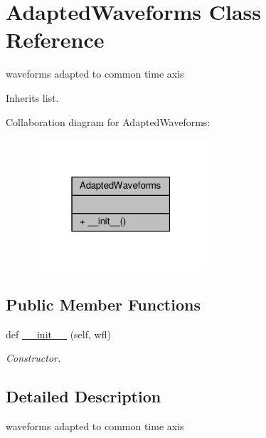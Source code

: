 \hypertarget{classSignalIntegrity_1_1TimeDomain_1_1Waveform_1_1AdaptedWaveforms_1_1AdaptedWaveforms}{}\section{Adapted\+Waveforms Class Reference}
\label{classSignalIntegrity_1_1TimeDomain_1_1Waveform_1_1AdaptedWaveforms_1_1AdaptedWaveforms}


waveforms adapted to common time axis  




Inherits list.



Collaboration diagram for Adapted\+Waveforms\+:
\nopagebreak
\begin{figure}[H]
\begin{center}
\leavevmode
\includegraphics[width=183pt]{classSignalIntegrity_1_1TimeDomain_1_1Waveform_1_1AdaptedWaveforms_1_1AdaptedWaveforms__coll__graph}
\end{center}
\end{figure}
\subsection*{Public Member Functions}
\begin{DoxyCompactItemize}
\item 
def \hyperlink{classSignalIntegrity_1_1TimeDomain_1_1Waveform_1_1AdaptedWaveforms_1_1AdaptedWaveforms_a15e87afe4d8ac1102a3665f80cb0611a}{\+\_\+\+\_\+init\+\_\+\+\_\+} (self, wfl)
\begin{DoxyCompactList}\small\item\em Constructor. \end{DoxyCompactList}\end{DoxyCompactItemize}


\subsection{Detailed Description}
waveforms adapted to common time axis 

